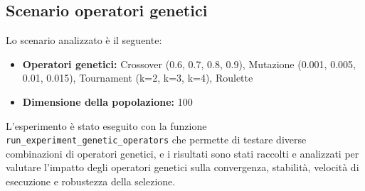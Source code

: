 \documentclass[11pt,a4paper]{article}
\begin{document}
\subsection{Scenario operatori genetici}
Lo scenario analizzato è il seguente:
\begin{itemize}
  \item \textbf{Operatori genetici:} Crossover (0.6, 0.7, 0.8, 0.9), Mutazione (0.001, 0.005, 0.01, 0.015), Tournament (k=2, k=3, k=4), Roulette
  \item \textbf{Dimensione della popolazione:} 100
\end{itemize}
L'esperimento è stato eseguito con la funzione \texttt{run\_experiment\_genetic\_operators} che permette di testare diverse combinazioni di operatori genetici, e i risultati sono stati raccolti e analizzati per valutare l'impatto degli operatori genetici sulla convergenza, stabilità, velocità di esecuzione e robustezza della selezione.
\end{document}
